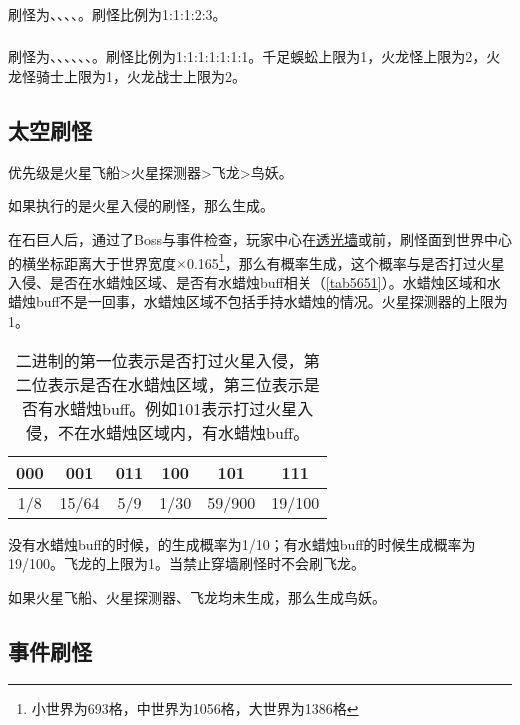 \subsubsection{}
刷怪为、、、、。刷怪比例为1:1:1:2:3。

\subsubsection{}
刷怪为、、、、、、。刷怪比例为1:1:1:1:1:1:1。千足蜈蚣上限为1，火龙怪上限为2，火龙怪骑士上限为1，火龙战士上限为2。

\subsection{太空刷怪}
优先级是火星飞船>火星探测器>飞龙>鸟妖。

如果执行的是火星入侵的刷怪，那么生成。

在石巨人后，通过了Boss与事件检查，玩家中心在\hyperref[app9]{透光墙}或前，刷怪面到世界中心的横坐标距离大于世界宽度$\times$0.165\footnote{小世界为693格，中世界为1056格，大世界为1386格}，那么有概率生成，这个概率与是否打过火星入侵、是否在水蜡烛区域、是否有水蜡烛buff相关（\autoref{tab5651}）。水蜡烛区域和水蜡烛buff不是一回事，水蜡烛区域不包括手持水蜡烛的情况。火星探测器的上限为1。

\begin{table}[!h]
    \centering
    \begin{tabular}{cccccc}
         000&001&011&100&101&111\\\hline
         1/8&15/64&5/9&1/30&59/900&19/100 
    \end{tabular}
    \caption{二进制的第一位表示是否打过火星入侵，第二位表示是否在水蜡烛区域，第三位表示是否有水蜡烛buff。例如101表示打过火星入侵，不在水蜡烛区域内，有水蜡烛buff。}
    \label{tab5651}
\end{table}

没有水蜡烛buff的时候，的生成概率为1/10；有水蜡烛buff的时候生成概率为19/100。飞龙的上限为1。当禁止穿墙刷怪时不会刷飞龙。

如果火星飞船、火星探测器、飞龙均未生成，那么生成鸟妖。

\subsection{事件刷怪}
